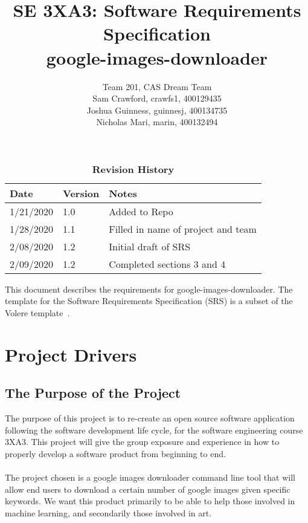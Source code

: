 \documentclass[12pt, titlepage]{article}
\title{SE 3XA3: Software Requirements Specification\\google-images-downloader}
\author{Team 201, CAS Dream Team
		\\ Sam Crawford, crawfs1, 400129435
		\\ Joshua Guinness, guinnesj, 400134735
		\\ Nicholas Mari, marin, 400132494
}
\begin{document}
\maketitle

\tableofcontents
\listoftables

\begin{table}[htp]
\caption{\bf Revision History}
\begin{tabularx}{\textwidth}{p{3cm}p{2cm}X}
\toprule {\bf Date} & {\bf Version} & {\bf Notes}\\
\midrule
1/21/2020 & 1.0 & Added to Repo\\
1/28/2020 & 1.1 & Filled in name of project and team\\
2/08/2020 & 1.2 & Initial draft of SRS \\
2/09/2020 & 1.2 & Completed sections 3 and 4 \\
\bottomrule
\end{tabularx}
\end{table}

\newpage


This document describes the requirements for google-images-downloader.  The 
template for the Software Requirements Specification (SRS) is a subset of the Volere
template~\citep{RobertsonAndRobertson2012}.

\section{Project Drivers}

\subsection{The Purpose of the Project}

The purpose of this project is to re-create an open source software application following the software development life cycle, for the software engineering course 3XA3. This project will give the group exposure and experience in how to properly develop a software product from beginning to end.
\\ \\
The project chosen is a google images downloader command line tool that will allow end users to download a certain number of google images given specific keywords. We want this product primarily to be able to help those involved in machine learning, and secondarily those involved in art.
\end{document}
